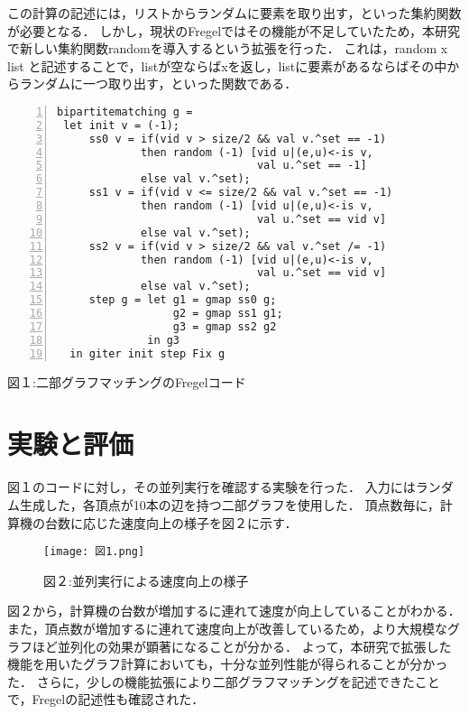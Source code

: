 \documentclass{AIabst}
\begin{document}
この計算の記述には，リストからランダムに要素を取り出す，といった集約関数が必要となる．
しかし，現状のFregelではその機能が不足していたため，本研究で新しい集約関数randomを導入するという拡張を行った．
これは，random x list と記述することで，listが空ならばxを返し，listに要素があるならばその中からランダムに一つ取り出す，といった関数である．
\begin{lstlisting}[basicstyle=\ttfamily\scriptsize, frame = single,  numbers = left, tabsize = 3]
bipartitematching g =
 let init v = (-1);
     ss0 v = if(vid v > size/2 && val v.^set == -1)
             then random (-1) [vid u|(e,u)<-is v,
                               val u.^set == -1]
             else val v.^set);
     ss1 v = if(vid v <= size/2 && val v.^set == -1)
             then random (-1) [vid u|(e,u)<-is v,
                               val u.^set == vid v]
             else val v.^set);
     ss2 v = if(vid v > size/2 && val v.^set /= -1)
             then random (-1) [vid u|(e,u)<-is v,
                               val u.^set == vid v]
             else val v.^set);
     step g = let g1 = gmap ss0 g;
                  g2 = gmap ss1 g1;
                  g3 = gmap ss2 g2
              in g3
  in giter init step Fix g

\end{lstlisting}
\centerline{図１:二部グラフマッチングのFregelコード}
\section{実験と評価}
図１のコードに対し，その並列実行を確認する実験を行った．
入力にはランダム生成した，各頂点が10本の辺を持つ二部グラフを使用した．
頂点数毎に，計算機の台数に応じた速度向上の様子を図２に示す．
\begin{figure}[h]
  \center
  \texttt{[image: 図1.png]}
  \centerline{図２:並列実行による速度向上の様子}
\end{figure}


図２から，計算機の台数が増加するに連れて速度が向上していることがわかる．
また，頂点数が増加するに連れて速度向上が改善しているため，より大規模なグラフほど並列化の効果が顕著になることが分かる．
よって，本研究で拡張した機能を用いたグラフ計算においても，十分な並列性能が得られることが分かった．
さらに，少しの機能拡張により二部グラフマッチングを記述できたことで，Fregelの記述性も確認された．

{\small
\baselineskip 11pt


}
\end{document}

